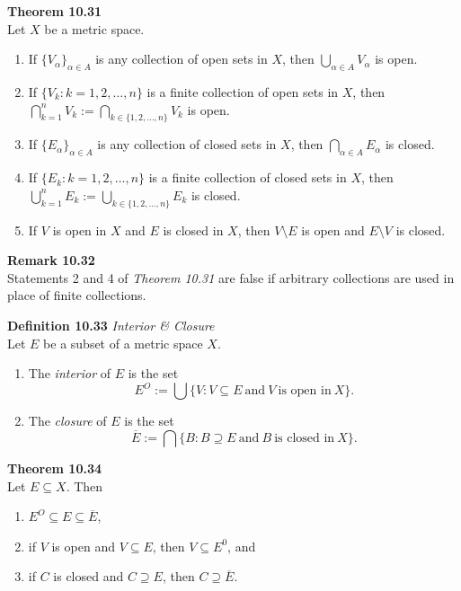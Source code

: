 \documentclass[8pt,landscape]{article}
\begin{document}
\begin{multicols}{3}
\textbf{Theorem 10.31} \\
Let $X$ be a metric space.
\begin{enumerate}
    \item If ${\{V_\alpha\}}_{\alpha \in A}$ is any collection of open sets in $X$,
        then $\bigcup_{\alpha \in A} V_\alpha$
        is open.
    \item If $\{V_k : k = 1, 2, \ldots, n\}$ is a finite collection of open sets in
        $X$, then
        $\bigcap_{k=1}^n V_k := \bigcap_{k \in \{1, 2, \ldots, n\}} V_k$
        is open.
    \item If ${\{E_\alpha\}}_{\alpha \in A}$ is any collection of closed sets in $X$,
        then $\bigcap_{\alpha \in A} E_\alpha$ is closed.
    \item If $\{E_k : k = 1, 2, \ldots, n\}$ is a finite collection of closed sets in
        $X$, then
        $\bigcup_{k=1}^n E_k := \bigcup_{k \in \{1, 2, \ldots, n\}} E_k$
        is closed.
    \item If $V$ is open in $X$ and $E$ is closed in $X$, then $V \setminus E$
        is open and $E \setminus V$ is closed.
\end{enumerate}


\textbf{Remark 10.32} \\
Statements 2 and 4 of \emph{Theorem 10.31} are false if arbitrary collections are used
in place of finite collections.


\textbf{Definition 10.33} \emph{Interior \& Closure} \\
Let $E$ be a subset of a metric space $X$.
\begin{enumerate}
    \item The \emph{interior} of $E$ is the set
        \[
            E^O := \bigcup \{ V : V \subseteq E \
            \text{and} \ V \ \text{is open in} \ X\}.
        \]
    \item The \emph{closure} of $E$ is the set
        \[
            \overline{E} := \bigcap \{ B : B \supseteq E \
            \text{and} \ B \ \text{is closed in} \ X\}.
        \]
\end{enumerate}

\textbf{Theorem 10.34} \\
Let $E \subseteq X$.
Then
\begin{enumerate}
    \item $E^O \subseteq E \subseteq \overline{E}$,
    \item if $V$ is open and $V \subseteq E$, then $V \subseteq E^0$, and
    \item if $C$ is closed and $C \supseteq E$, then $C \supseteq \overline{E}$.
\end{enumerate}



\end{multicols}
\end{document}
